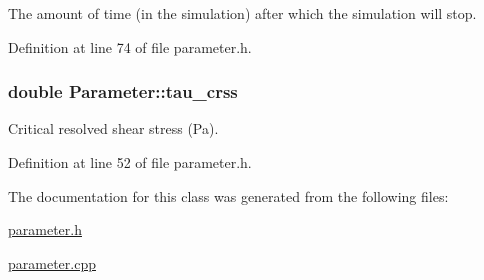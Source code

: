 \-The amount of time (in the simulation) after which the simulation will stop. 



\-Definition at line 74 of file parameter.\-h.

\hypertarget{classParameter_a043c7fdd972cc9f9a23e79ecdcdf7d4a}{
\subsubsection[{tau\-\_\-crss}]{\setlength{\rightskip}{0pt plus 5cm}double {\bf \-Parameter\-::tau\-\_\-crss}}}\label{dc/dab/classParameter_a043c7fdd972cc9f9a23e79ecdcdf7d4a}


\-Critical resolved shear stress (\-Pa). 



\-Definition at line 52 of file parameter.\-h.



\-The documentation for this class was generated from the following files\-:\begin{DoxyCompactItemize}
\item 
\hyperlink{parameter_8h}{parameter.\-h}\item 
\hyperlink{parameter_8cpp}{parameter.\-cpp}\end{DoxyCompactItemize}
